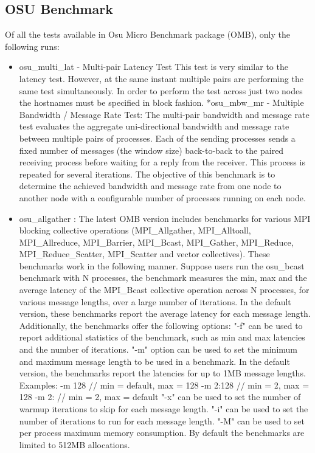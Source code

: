 \documentclass[11pt,a4paper,oldfontcommands]{article}
\begin{document}
\subsection{OSU Benchmark}
Of all the tests available in Osu Micro Benchmark package (OMB), only the following runs:
\begin{itemize}
\item osu\_multi\_lat - Multi-pair Latency Test
This test is very similar to the latency test. However, at the same instant multiple pairs are performing the same test simultaneously. In order to perform the test across just two nodes the hostnames must be specified in block fashion.
*osu\_mbw\_mr - Multiple Bandwidth / Message Rate Test: The multi-pair bandwidth and message rate test evaluates the aggregate uni-directional bandwidth and message rate between multiple pairs of processes. Each of the sending processes sends a fixed number of messages (the window size) back-to-back to the paired receiving process before waiting for a reply from the receiver. This process is repeated for several iterations. The objective of this benchmark is to determine the achieved bandwidth and message rate from one node to another node with a configurable number of processes running on each node.
\item osu\_allgather : The latest OMB version includes benchmarks for various MPI blocking collective operations (MPI\_Allgather, MPI\_Alltoall, MPI\_Allreduce, MPI\_Barrier, MPI\_Bcast, MPI\_Gather, MPI\_Reduce, MPI\_Reduce\_Scatter, MPI\_Scatter and vector collectives). These benchmarks work in the following manner. Suppose users run the osu\_bcast benchmark with N processes, the benchmark measures the min, max and the average latency of the MPI\_Bcast collective operation across N processes, for various message lengths, over a large number of iterations. In the default version, these benchmarks report the average latency for each message length. Additionally, the benchmarks offer the following options: "-f" can be used to report additional statistics of the benchmark, such as min and max latencies and the number of iterations. "-m" option can be used to set the minimum and maximum message length to be used in a benchmark. In the default version, the benchmarks report the latencies for up to 1MB message lengths. Examples: -m 128 // min = default, max = 128 -m 2:128 // min = 2, max = 128 -m 2: // min = 2, max = default "-x" can be used to set the number of warmup iterations to skip for each message length. "-i" can be used to set the number of iterations to run for each message length. "-M" can be used to set per process maximum memory consumption. By default the benchmarks are limited to 512MB allocations.

\end{itemize}
\end{document}
